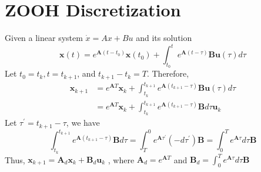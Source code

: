 \documentclass{article}
\begin{document}
\section{ZOOH Discretization}

Given a linear system $\dot{x} = Ax+Bu$ and its solution 
$$
\mathbf{x}(t)=e^{\mathbf{A}\left(t-t_{0}\right)} \mathbf{x}\left(t_{0}\right)+\int_{t_{0}}^{t} e^{\mathbf{A}(t-\tau)} \mathbf{B u}(\tau) d \tau
$$
Let $t_{0}=t_{k}, t=t_{k+1}$, and $t_{k+1}-t_{k}=T$. Therefore,
$$
\begin{aligned}
\mathbf{x}_{k+1} &=e^{\mathbf{A} T} \mathbf{x}_{k}+\int_{t_{k}}^{t_{k+1}} e^{\mathbf{A}\left(t_{k+1}-\tau\right)} \mathbf{B u}(\tau) d \tau \\
&=e^{\mathbf{A} T} \mathbf{x}_{k}+\int_{t_{k}}^{t_{k+1}} e^{\mathbf{A}\left(t_{k+1}-\tau\right)} \mathbf{B} d \tau \mathbf{u}_{k}
\end{aligned}
$$
Let $\tau^{\prime}=t_{k+1}-\tau$, we have
$$
\int_{t_{k}}^{t_{k+1}} e^{\mathbf{A}\left(t_{k+1}-\tau\right)} \mathbf{B} d \tau=\int_{T}^{0} e^{\mathbf{A} \tau^{\prime}}\left(-d \tau^{\prime}\right) \mathbf{B}=\int_{0}^{T} e^{\mathbf{A} \tau} d \tau \mathbf{B}
$$
Thus,
$\mathbf{x}_{k+1} =\mathbf{A}_{d} \mathbf{x}_{k}+\mathbf{B}_{d} \mathbf{u}_{k}$
, where 
$\mathbf{A}_{d} =e^{\mathbf{A} T}$ 
and 
$\mathbf{B}_{d} =\int_{0}^{T} e^{\mathbf{A} \tau} d \tau \mathbf{B}$
\end{document}
